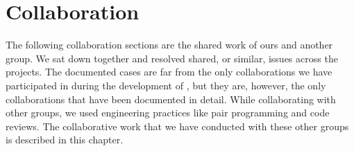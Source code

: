
\chapter{Collaboration}

The following collaboration sections are the shared work of ours and another group. We sat down together and resolved shared, or similar, issues across the projects. The documented cases are far from the only collaborations we have participated in during the development of \giraf, but they are, however, the only collaborations that have been documented in detail. While collaborating with other groups, we used engineering practices like pair programming and code reviews. The collaborative work that we have conducted with these other groups is described in this chapter.



